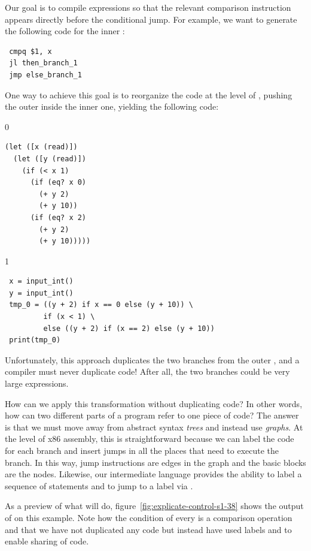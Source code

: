 \documentclass[7x10]{TimesAPriori_MIT}%
\def\racketEd{0}
\def\pythonEd{1}
\providecommand{\BookEdition}{1}
\let\edition\BookEdition
\newcommand{\pythonColor}[0]{}
\numberwithin{theorem}{chapter}
\numberwithin{definition}{chapter}
\numberwithin{equation}{chapter}
\begin{document}
Our goal is to compile  expressions so that the relevant
comparison instruction appears directly before the conditional jump.
For example, we want to generate the following code for the inner
:
\begin{center}
\begin{minipage}{0.96\textwidth}
\begin{lstlisting}
 cmpq $1, x
 jl then_branch_1
 jmp else_branch_1
\end{lstlisting}
\end{minipage}
\end{center}
One way to achieve this goal is to reorganize the code at the level of
\LangIfANF{}, pushing the outer  inside the inner one, yielding
the following code:
\begin{center}
\begin{minipage}{0.96\textwidth}
{\if\edition\racketEd        
\begin{lstlisting}
(let ([x (read)])
  (let ([y (read)])
    (if (< x 1) 
      (if (eq? x 0)
        (+ y 2)
        (+ y 10))
      (if (eq? x 2)
        (+ y 2)
        (+ y 10)))))
\end{lstlisting}
\fi}
{\if\edition\pythonEd\pythonColor
\begin{lstlisting}
 x = input_int()
 y = input_int()
 tmp_0 = ((y + 2) if x == 0 else (y + 10)) \
         if (x < 1) \
         else ((y + 2) if (x == 2) else (y + 10))
 print(tmp_0)
\end{lstlisting}
\fi}
\end{minipage}
\end{center}
Unfortunately, this approach duplicates the two branches from the
outer , and a compiler must never duplicate code!  After all,
the two branches could be very large expressions.

How can we apply this transformation without duplicating code? In
other words, how can two different parts of a program refer to one
piece of code?
%
The answer is that we must move away from abstract syntax \emph{trees}
and instead use \emph{graphs}.
%
At the level of x86 assembly, this is straightforward because we can
label the code for each branch and insert jumps in all the places that
need to execute the branch. In this way, jump instructions are edges
in the graph and the basic blocks are the nodes.
%
Likewise, our intermediate language \LangCIf{} provides the ability to
label a sequence of statements and to jump to a label via .

As a preview of what  will do,
figure~\ref{fig:explicate-control-s1-38} shows the output of
\code{explicate\_control} on this example. Note how the condition of
every \code{if} is a comparison operation and that we have not
duplicated any code but instead have used labels and \code{goto} to
enable sharing of code.
\end{document}
